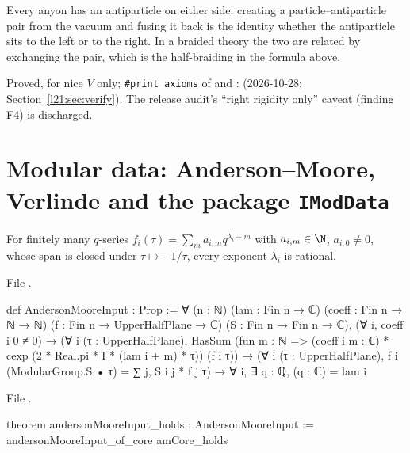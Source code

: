\begin{physics}
Every anyon has an antiparticle on either side: creating a particle--antiparticle pair from the vacuum and fusing it back is the
identity whether the antiparticle sits to the left or to the right. In a braided theory the two are related by exchanging the
pair, which is the half-braiding in the formula above.
\end{physics}

\begin{status}
Proved, for nice $V$ only; \texttt{\#print axioms} of  and :
 (2026-10-28; Section~\ref{l21:sec:verify}). The release audit's ``right rigidity
only'' caveat (finding F4) is discharged.
\end{status}

\section{Modular data: Anderson--Moore, Verlinde and the package \texorpdfstring{\texttt{IModData}}{IModData}}\label{l21:sec:moddata}

\begin{definition}\label{l21:def:am}
For finitely many $q$-series $f_i(\tau)=\sum_m a_{i,m}q^{\lambda_i+m}$ with $a_{i,m}\in\N$, $a_{i,0}\ne0$, whose span is
closed under $\tau\mapsto-1/\tau$, every exponent $\lambda_i$ is rational.
\end{definition}
\noindent File .
\begin{leancode}
def AndersonMooreInput : Prop :=
  ∀ (n : ℕ) (lam : Fin n → ℂ) (coeff : Fin n → ℕ → ℕ) (f : Fin n → UpperHalfPlane → ℂ)
    (S : Fin n → Fin n → ℂ),
    (∀ i, coeff i 0 ≠ 0) →
    (∀ i (τ : UpperHalfPlane), HasSum (fun m : ℕ => (coeff i m : ℂ) *
        cexp (2 * Real.pi * I * (lam i + m) * τ)) (f i τ)) →
    (∀ i (τ : UpperHalfPlane), f i (ModularGroup.S • τ) = ∑ j, S i j * f j τ) →
    ∀ i, ∃ q : ℚ, (q : ℂ) = lam i
\end{leancode}
\noindent File .
\begin{leancode}
theorem andersonMooreInput_holds : AndersonMooreInput :=
  andersonMooreInput_of_core amCore_holds
\end{leancode}

